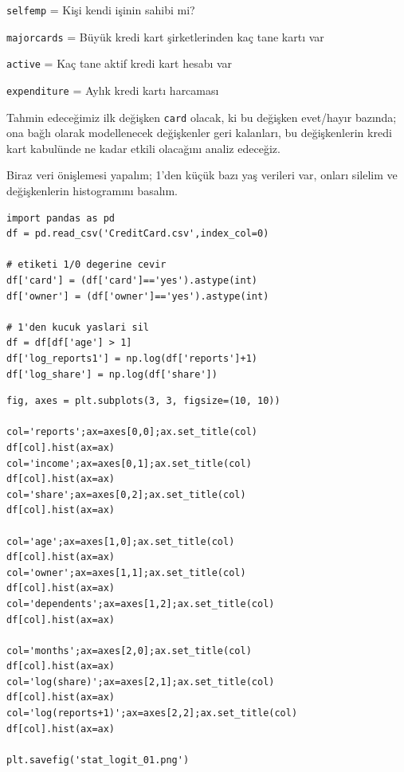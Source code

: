 \documentclass[12pt,fleqn]{article}\usepackage{../../common}
\begin{document}
\verb!selfemp! = Kişi kendi işinin sahibi mi?

\verb!majorcards! = Büyük kredi kart şirketlerinden kaç tane kartı var

\verb!active! = Kaç tane aktif kredi kart hesabı var

\verb!expenditure! = Aylık kredi kartı harcaması

Tahmin edeceğimiz ilk değişken \verb!card! olacak, ki bu değişken evet/hayır
bazında; ona bağlı olarak modellenecek değişkenler geri kalanları, bu
değişkenlerin kredi kart kabulünde ne kadar etkili olacağını analiz edeceğiz.

Biraz veri önişlemesi yapalım; 1'den küçük bazı yaş verileri var, onları silelim
ve değişkenlerin histogramını basalım.

\begin{verbatim}
import pandas as pd
df = pd.read_csv('CreditCard.csv',index_col=0)

# etiketi 1/0 degerine cevir
df['card'] = (df['card']=='yes').astype(int)
df['owner'] = (df['owner']=='yes').astype(int)

# 1'den kucuk yaslari sil
df = df[df['age'] > 1]
df['log_reports1'] = np.log(df['reports']+1)
df['log_share'] = np.log(df['share'])
\end{verbatim}

\begin{verbatim}
fig, axes = plt.subplots(3, 3, figsize=(10, 10))

col='reports';ax=axes[0,0];ax.set_title(col)
df[col].hist(ax=ax)
col='income';ax=axes[0,1];ax.set_title(col)
df[col].hist(ax=ax)
col='share';ax=axes[0,2];ax.set_title(col)
df[col].hist(ax=ax)

col='age';ax=axes[1,0];ax.set_title(col)
df[col].hist(ax=ax)
col='owner';ax=axes[1,1];ax.set_title(col)
df[col].hist(ax=ax)
col='dependents';ax=axes[1,2];ax.set_title(col)
df[col].hist(ax=ax)

col='months';ax=axes[2,0];ax.set_title(col)
df[col].hist(ax=ax)
col='log(share)';ax=axes[2,1];ax.set_title(col)
df[col].hist(ax=ax)
col='log(reports+1)';ax=axes[2,2];ax.set_title(col)
df[col].hist(ax=ax)

plt.savefig('stat_logit_01.png')
\end{verbatim}
\end{document}
